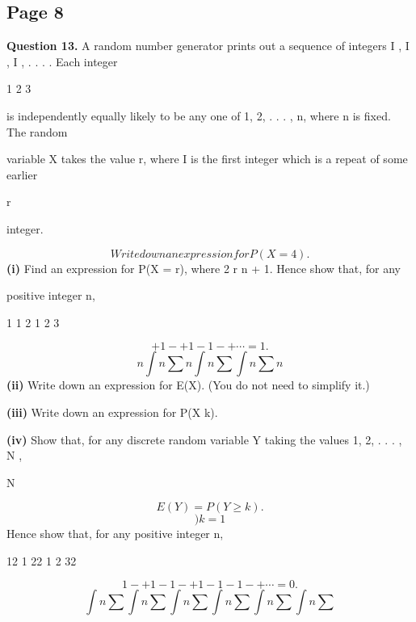 \documentclass[12pt]{article}
\begin{document}
\subsection*{Page 8}
\begin{flushleft}
\bigskip\textbf{Question 13.} A random number generator prints out a sequence of integers I , I , I , . . . . Each integer\par
1 2 3\par
is independently equally likely to be any one of 1, 2, . . . , n, where n is fixed. The random\par
variable X takes the value r, where I is the first integer which is a repeat of some earlier\par
r\par
integer.\par
\[Write down an expression for P(X = 4).\]
\textbf{(i)} Find an expression for P(X = r), where 2 \leq r \leq n + 1. Hence show that, for any\par
positive integer n,\par
1 1 2 1 2 3\par
\[+ 1 - + 1 - 1 - + \cdots = 1 .\]
\[n \int n \sum n \int n \sum \int n \sum n\]
\textbf{(ii)} Write down an expression for E(X). (You do not need to simplify it.)\par
\textbf{(iii)} Write down an expression for P(X \geq k).\par
\textbf{(iv)} Show that, for any discrete random variable Y taking the values 1, 2, . . . , N ,\par
N\par
\[E(Y ) = P(Y \geq k) .\]
\[)k=1\]
Hence show that, for any positive integer n,\par
12 1 22 1 2 32\par
\[1 - + 1 - 1 - + 1 - 1 - 1 - + \cdots = 0.\]
\[\int n \sum \int n \sum \int n \sum \int n \sum \int n \sum \int n \sum\]
\end{flushleft}
\end{document}
